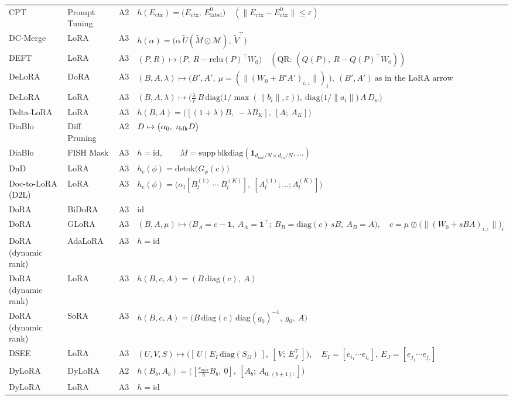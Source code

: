 \begin{longtable}{@{}>{\raggedright\arraybackslash}p{2.4cm}>{\raggedright\arraybackslash}p{2.4cm}c>{\raggedright\arraybackslash}p{8.6cm}@{}}
CPT & Prompt Tuning & A2 & $h(E_{\mathrm{ctx}})=\big(E_{\mathrm{ctx}},\,E^{0}_{\mathrm{label}}\big)\quad(\|E_{\mathrm{ctx}}-E^0_{\mathrm{ctx}}\|\le\varepsilon)$\\
DC-Merge & LoRA & A3 & $h(\alpha)=\big(\alpha\,\widetilde U(\widetilde M\odot\mathcal M),\ \widetilde V^\top\big)$\\
DEFT & LoRA & A3 & $(P,R)\mapsto\big(P,\ R-\mathrm{relu}(P)^\top W_0\big)\quad(\text{QR: }(Q(P),\ R-Q(P)^\top W_0))$\\
DeLoRA & DoRA & A3 & $(B,A,\lambda)\mapsto\big(B',A',\ \mu=(\|(W_0+B'A')_{i,:}\|)_i\big),\ (B',A')\ \text{as in the LoRA arrow}$\\
DeLoRA & LoRA & A3 & $(B,A,\lambda)\mapsto\Big(\tfrac{\lambda}{r}\,B\,\mathrm{diag}\big(1/\max(\|b_i\|,\varepsilon)\big),\ \mathrm{diag}\big(1/\|a_i\|\big)\,A\,D_w\Big)$\\
Delta-LoRA & LoRA & A3 & $h(B,A)=\big([(1+\lambda)B,\ -\lambda B_K],\ [A;\ A_K]\big)$\\
DiaBlo & Diff Pruning & A2 & $D\mapsto\big(\alpha_0,\ \iota_{\rm blk}D\big)$\\
DiaBlo & FISH Mask & A3 & $h=\mathrm{id},\qquad M=\mathrm{supp}\,\mathrm{blkdiag}(\mathbf 1_{d_{out}/N\times d_{in}/N},\dots)$\\
DnD & LoRA & A3 & $h_c(\phi)=\mathrm{detok}\big(G_\phi(c)\big)$\\
Doc-to-LoRA (D2L) & LoRA & A3 & $h_c(\phi)=\big(\alpha_l[B^{(1)}_l\ \cdots\ B^{(K)}_l],\ [A^{(1)}_l;\dots;A^{(K)}_l]\big)$\\
DoRA & BiDoRA & A3 & $\mathrm{id}$\\
DoRA & GLoRA & A3 & $(B,A,\mu)\mapsto\big(B_A=c-\mathbf 1,\ A_A=\mathbf 1^\top;\ B_B=\mathrm{diag}(c)\,sB,\ A_B=A\big),\quad c=\mu\oslash\big(\|(W_0+sBA)_{i,:}\|\big)_i$\\
DoRA (dynamic rank) & AdaLoRA & A3 & $h=\mathrm{id}$\\
DoRA (dynamic rank) & LoRA & A3 & $h(B,c,A)=(B\,\mathrm{diag}(c),\ A)$\\
DoRA (dynamic rank) & SoRA & A3 & $h(B,c,A)=\big(B\,\mathrm{diag}(c)\,\mathrm{diag}(g_0)^{-1},\ g_0,\ A\big)$\\
DSEE & LoRA & A3 & $(U,V,S)\mapsto\big([\,U\mid E_I\,\mathrm{diag}(S_\Omega)\,],\ [\,V;\ E_J^\top\,]\big),\quad E_I=[e_{i_1}\cdots e_{i_c}],\ E_J=[e_{j_1}\cdots e_{j_c}]$\\
DyLoRA & DyLoRA & A2 & $h(B_b,A_b)=\big([\tfrac{r_{\max}}{b}B_b,\ 0],\ [A_b;\ A_{0,(b+1):}]\big)$\\
DyLoRA & LoRA & A3 & $h=\mathrm{id}$\\

\end{longtable}
